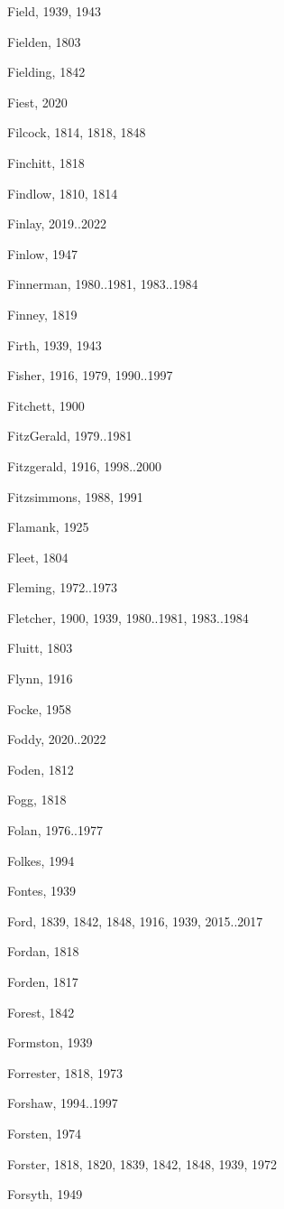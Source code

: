 \begin{theindex}
\item Field, 1939, 1943
\item Fielden, 1803
\item Fielding, 1842
\item Fiest, 2020
\item Filcock, 1814, 1818, 1848
\item Finchitt, 1818
\item Findlow, 1810, 1814
\item Finlay, 2019..2022
\item Finlow, 1947
\item Finnerman, 1980..1981, 1983..1984
\item Finney, 1819
\item Firth, 1939, 1943
\item Fisher, 1916, 1979, 1990..1997
\item Fitchett, 1900
\item FitzGerald, 1979..1981
\item Fitzgerald, 1916, 1998..2000
\item Fitzsimmons, 1988, 1991
\item Flamank, 1925
\item Fleet, 1804
\item Fleming, 1972..1973
\item Fletcher, 1900, 1939, 1980..1981, 1983..1984
\item Fluitt, 1803
\item Flynn, 1916
\item Focke, 1958
\item Foddy, 2020..2022
\item Foden, 1812
\item Fogg, 1818
\item Folan, 1976..1977
\item Folkes, 1994
\item Fontes, 1939
\item Ford, 1839, 1842, 1848, 1916, 1939, 2015..2017
\item Fordan, 1818
\item Forden, 1817
\item Forest, 1842
\item Formston, 1939
\item Forrester, 1818, 1973
\item Forshaw, 1994..1997
\item Forsten, 1974
\item Forster, 1818, 1820, 1839, 1842, 1848, 1939, 1972
\item Forsyth, 1949

\end{theindex}
